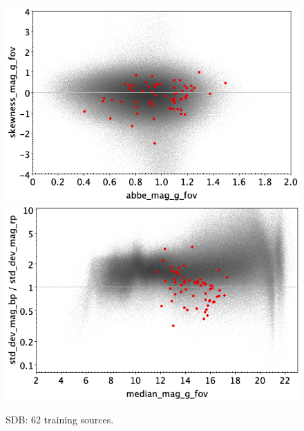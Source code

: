 \documentclass[longauth]{aa}
\begin{document}
\begin{appendix}
\begin{figure}
\vspace{4mm}
 \includegraphics[width=0.45\hsize]{figures/appendix/SDB_trn_ask.png}  %
\hspace{2mm}
 \includegraphics[width=0.45\hsize]{figures/appendix/SDB_trn_msdr.png}  \\ %
\vspace{4mm}
 \caption{SDB: 62 training sources.}  
 \label{fig:app:SDB_trn}
\end{figure}


\end{appendix}
\end{document}
